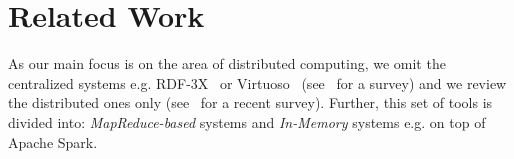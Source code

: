 





\section{Related Work}
\label{sec:related_work}

As our main focus is on the area of distributed computing, we omit the centralized systems e.g. RDF-3X~\cite{Neumann2008RRE} or Virtuoso~\cite{Erling2010} (see~\cite{faye2012survey} for a survey) and we review the distributed ones only (see~\cite{kaoudi2015rdf} for a recent survey).
Further, this set of tools is divided into: \textit{MapReduce-based} systems and \textit{In-Memory} systems e.g. on top of Apache Spark.

